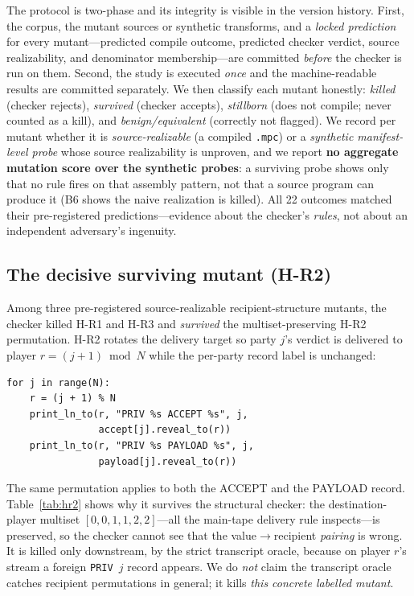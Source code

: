 \documentclass[conference]{IEEEtran}
\newcommand{\code}[1]{\texttt{\small #1}}
\begin{document}
The protocol is two-phase and its integrity is visible in the version history. First, the
corpus, the mutant sources or synthetic transforms, and a \emph{locked prediction} for
every mutant---predicted compile outcome, predicted checker verdict, source realizability,
and denominator membership---are committed \emph{before} the checker is run on them. Second,
the study is executed \emph{once} and the machine-readable results are committed separately.
We then classify each mutant honestly: \emph{killed} (checker rejects), \emph{survived}
(checker accepts), \emph{stillborn} (does not compile; never counted as a kill), and
\emph{benign/equivalent} (correctly not flagged). We record per mutant whether it is
\emph{source-realizable} (a compiled \code{.mpc}) or a \emph{synthetic manifest-level probe}
whose source realizability is unproven, and we report \textbf{no aggregate mutation score
over the synthetic probes}: a surviving probe shows only that no rule fires on that assembly
pattern, not that a source program can produce it (B6 shows the naive realization is killed).
All 22 outcomes matched their pre-registered predictions---evidence about the checker's
\emph{rules}, not about an independent adversary's ingenuity.

\subsection{The decisive surviving mutant (H-R2)}
\label{sec:hr2}
Among three pre-registered source-realizable recipient-structure mutants, the checker killed
H-R1 and H-R3 and \emph{survived} the multiset-preserving H-R2 permutation. H-R2 rotates the
delivery target so party $j$'s verdict is delivered to player $r=(j{+}1)\bmod N$ while the
per-party record label is unchanged:

\begin{lstlisting}
for j in range(N):
    r = (j + 1) % N
    print_ln_to(r, "PRIV %s ACCEPT %s", j,
                accept[j].reveal_to(r))
    print_ln_to(r, "PRIV %s PAYLOAD %s", j,
                payload[j].reveal_to(r))
\end{lstlisting}

\noindent The same permutation applies to both the ACCEPT and the PAYLOAD record.
Table~\ref{tab:hr2} shows why it survives the structural checker: the destination-player
multiset $[0,0,1,1,2,2]$---all the main-tape delivery rule inspects---is preserved, so the
checker cannot see that the value$\to$recipient \emph{pairing} is wrong. It is killed only
downstream, by the strict transcript oracle, because on player $r$'s stream a foreign
\code{PRIV\,$j$} record appears. We do \emph{not} claim the transcript oracle catches
recipient permutations in general; it kills \emph{this concrete labelled mutant}.
\end{document}
